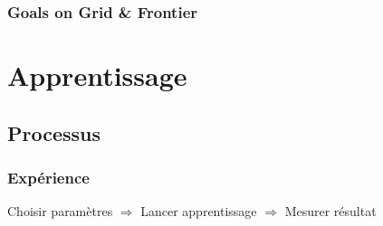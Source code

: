 \documentclass[french]{beamer}
\begin{document}

\begin{frame}
    \frametitle{Goals on Grid \& Frontier}



    \center

\end{frame}



\section{Apprentissage}


\subsection{Processus}

\begin{frame}
    \frametitle{Expérience}
    
    Choisir paramètres $\Rightarrow$ Lancer apprentissage $\Rightarrow$ Mesurer résultat
\end{frame}
\end{document}
